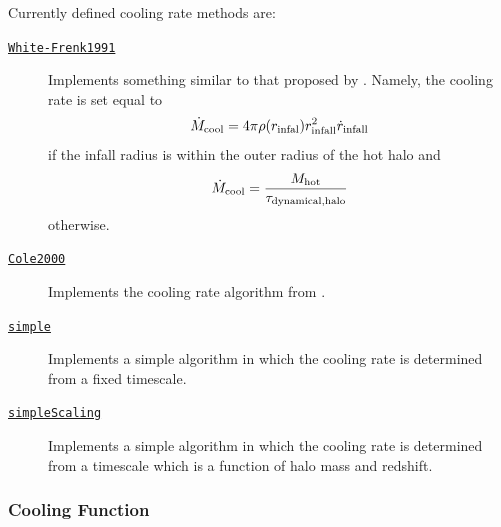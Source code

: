 Currently defined cooling rate methods are:
\begin{description}
 \item [\hyperlink{cooling.cooling_rate.White-Frenk.F90:cooling_rates_white_frenk:cooling_rate_white_frenk}{{\tt White-Frenk1991}}] Implements something similar to that proposed by \cite{white_galaxy_1991}. Namely, the cooling rate is set equal to
 \begin{equation}
  \dot{M}_{\rm cool} = 4 \pi \rho(r_{\rm infal}) r_{\rm infall}^2 \dot{r}_{\rm infall}
 \end{equation}
 if the infall radius is within the outer radius of the hot halo and
 \begin{equation}
  \dot{M}_{\rm cool} = {M_{\rm hot} \over \tau_{\rm dynamical,halo}}
 \end{equation}
 otherwise.
\item [\hyperlink{cooling.cooling_rate.Cole2000.F90:cooling_rates_cole2000:cooling_rate_cole2000}{{\tt Cole2000}}] Implements the cooling rate algorithm from \cite{cole_hierarchical_2000}.
\item [\hyperlink{cooling.cooling_rate.simple.F90:cooling_rates_simple:cooling_rate_simple}{{\tt simple}}] Implements a simple algorithm in which the cooling rate is determined from a fixed timescale.
\item [\hyperlink{cooling.cooling_rate.simple_scaling.F90:cooling_rates_simple_scaling:cooling_rate_simple_scaling}{{\tt simpleScaling}}] Implements a simple algorithm in which the cooling rate is determined from a timescale which is a function of halo mass and redshift.
\end{description}

\subsubsection{Cooling Function}\label{sec:CoolingFunctionMethods}

